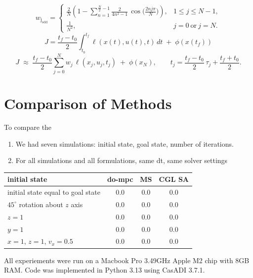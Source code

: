 \documentclass[]{article}
\begin{document}
	\[
        w_{\mathrm{j_{odd}}} =
        \begin{cases}
        \displaystyle
        \frac{2}{N}\!\left(
        1 - \sum_{n=1}^{\frac{N}{2}-1} \frac{2}{4n^{2}-1}\,
        \cos\!\Big(\tfrac{2 n j \pi}{N}\Big)
        \right), & 1 \le j \le N-1, \\[2ex]
        \displaystyle \frac{1}{N^{2}}, & j=0\ \text{or}\ j=N.
        \end{cases}
        \]
        	\[
	J=\frac{t_f-t_0}{2}\int_{t_0}^{t_f} \ell(x(t),u(t),t)\,dt \;+\; \phi(x(t_f))
        \]
        \[
        J \;\approx\; \frac{t_f-t_0}{2} \sum_{j=0}^{N} w_j \,\ell(x_j,u_j,t_j)
        \;+\; \phi(x_N),
        \qquad t_j = \frac{t_f-t_0}{2}\,\tau_j + \frac{t_f+t_0}{2}.
        \]
        	

\section*{Comparison of Methods}

To compare the 
\begin{enumerate}
	\item We had seven simulations: initial state, goal state, number of iterations.
	\item For all simulations and all formulations, same dt, same solver settings

\end{enumerate}	

\begin{center}
	\begin{tabular}{ | l | c | c | c | } 
		\hline
		 initial state & do-mpc & MS & CGL SA \\
		\hline
		initial state equal to goal state & 0.0 & 0.0 & 0.0 \\ 
		$45^{\circ}$ rotation about $z$ axis & 0.0 & 0.0 & 0.0 \\ 
		$z = 1$  & 0.0 & 0.0 & 0.0 \\ 
		$y = 1$  & 0.0 & 0.0 & 0.0 \\ 
		$x = 1$, $z=1$, $v_x = 0.5$  & 0.0 & 0.0 & 0.0 \\ 
		\hline
	\end{tabular}
\end{center}

	All experiements were run on a Macbook Pro  3.49GHz Apple M2 chip with 8GB RAM. Code was implemented in Python 3.13 using CasADI 3.7.1. 
	
\end{document}
